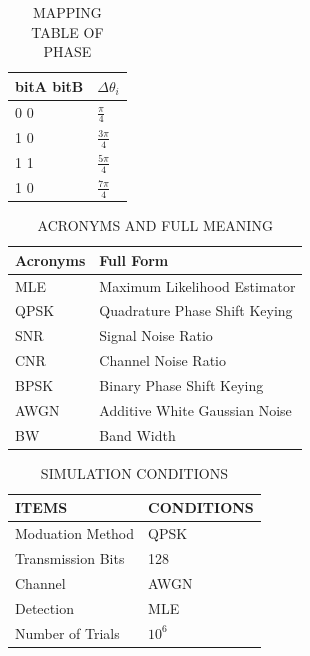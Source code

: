 \documentclass[technicalreport]{ieicej}
\begin{document}
\begin{table}[tbp]
	\begin{center}
	\caption{MAPPING TABLE OF PHASE}
	\begin{tabular}{ll}
	\hline
	\textbf{bitA bitB} & \textbf{$\Delta\theta_{i}$} \\
	\hline
	0 0 & $\frac{\pi}{4}$ \\
	1 0 & $\frac{3\pi}{4}$ \\
	1 1 & $\frac{5\pi}{4}$ \\
	1 0 & $\frac{7\pi}{4}$ \\
	\hline
	\end{tabular}
	\end{center}
\end{table}

\begin{table}[tbp]
	\begin{center}
	\caption{ACRONYMS AND FULL MEANING}
	\begin{tabular}{|l|l|}
	\hline
	\textbf{Acronyms} & \textbf{Full Form} \\
	\hline
	 MLE & Maximum Likelihood Estimator  \\ 
	 \hline
	 QPSK & Quadrature Phase Shift Keying  \\ 
	 \hline
	 SNR & Signal Noise Ratio \\ 
	 \hline
	 CNR & Channel Noise Ratio  \\ 
	 \hline
	 BPSK & Binary Phase Shift Keying  \\ 
	 \hline
	 AWGN & Additive White Gaussian Noise \\ 
	 \hline
	 BW & Band Width  \\ 
	 \hline
	\end{tabular}
	\end{center}
\end{table}

\begin{table}[hb]
	\begin{center}
	\caption{SIMULATION CONDITIONS}
	\label{tbl:simu}
	\small
	\begin{tabular}{ll}
	\hline
	ITEMS & CONDITIONS\\
	\hline
	Moduation Method & QPSK \\
	Transmission 	Bits & 128 \\
	Channel & AWGN \\
	Detection & MLE \\
	Number of Trials & $10^{6}$\\
	\hline
	\end{tabular}
	\end{center}
\end{table}
\end{document}
